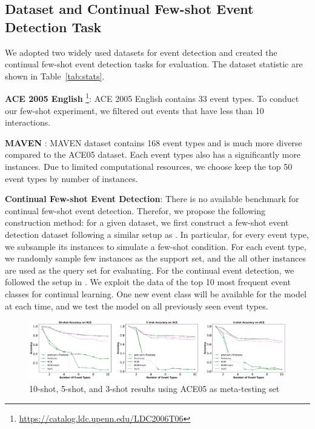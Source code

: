 



  
\subsection{Dataset and Continual Few-shot Event Detection Task}
We adopted two widely used datasets for event detection and created the continual few-shot event detection tasks for evaluation. The dataset statistic are shown in Table~\ref{tab:stats}.

\noindent
\textbf{ACE 2005 English} \footnote{\url{https://catalog.ldc.upenn.edu/LDC2006T06}}: ACE 2005 English contains 33 event types.  To conduct our few-shot experiment, we filtered out events that have less than 10 interactions.

\noindent
\textbf{MAVEN} \citep{wang2020MAVEN}: MAVEN dataset contains 168 event types and is much more diverse compared to the ACE05 dataset. Each event types also has a significantly more instances.  Due to limited computational resources,  we choose keep the top 50 event types by number of instances.  

\noindent
\textbf{Continual Few-shot Event Detection}: There is no available benchmark for continual few-shot event detection. Therefor, we propose the following construction method: for a given dataset,  we first construct a few-shot event detection dataset following a similar setup as \citep{chen2021honey}.  In particular,  for every event type,  we subsample its instances to simulate a few-shot condition.  For each event type, we randomly sample few instances as the support set, and the all other instances are used as the query set for evaluating.  For the continual event detection,  we followed the setup in \citep{cao2020incremental}.  We exploit the data of the top 10 most frequent event classes for continual learning. One new event class will be available for the model at each time, and we test the model on all previously seen event types. 

\begin{figure}[ht]
\centering
    \includegraphics[scale=0.28]{imgs/MAVEN_ACE.jpg}
    \caption{10-shot, 5-shot, and 3-shot results using ACE05 as meta-testing set}
    \label{img:result_ACE}
\end{figure}
